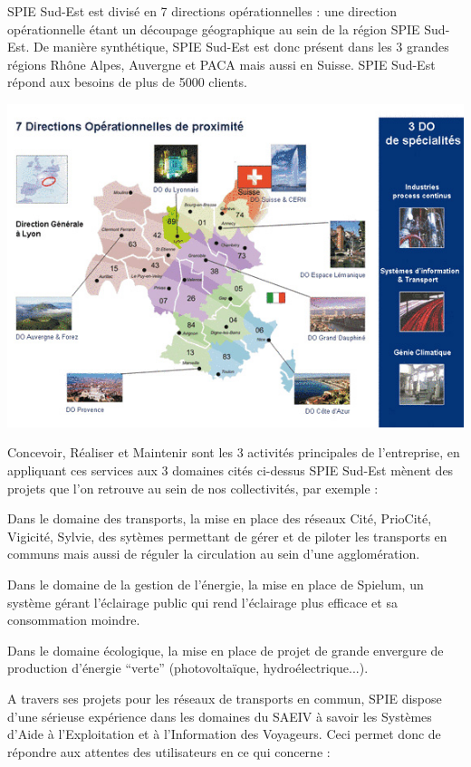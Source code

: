 SPIE Sud-Est est divisé en 7 directions opérationnelles : une direction opérationnelle étant un découpage géographique au sein de la région SPIE Sud-Est. De manière synthétique, SPIE Sud-Est est donc présent dans les 3 grandes régions Rhône Alpes, Auvergne et PACA mais aussi en Suisse. SPIE Sud-Est répond aux besoins de plus de 5000 clients.

\begin {center}
\includegraphics[width=\textwidth]{png/TerritoireSPIE.jpg}
\end {center}

Concevoir, Réaliser et Maintenir sont les 3 activités principales de l’entreprise, en appliquant ces services aux 3 domaines cités ci-dessus SPIE Sud-Est mènent des projets que l’on retrouve au sein de nos collectivités, par exemple :

Dans le domaine des transports, la mise en place des réseaux Cité, PrioCité, Vigicité, Sylvie, des sytèmes permettant de gérer et de piloter les transports en communs mais aussi de réguler la circulation au sein d’une agglomération.

Dans le domaine de la gestion de l’énergie, la mise en place de Spielum, un système gérant l’éclairage public qui rend l’éclairage plus efficace et sa consommation moindre.

Dans le domaine écologique, la mise en place de projet de grande envergure de production d’énergie “verte” (photovoltaïque, hydroélectrique...).

A travers ses projets pour les réseaux de transports en commun, SPIE dispose d’une sérieuse expérience dans les domaines du SAEIV à savoir les Systèmes d’Aide à l’Exploitation et à l’Information des Voyageurs. Ceci permet donc de répondre aux attentes des utilisateurs en ce qui concerne :

